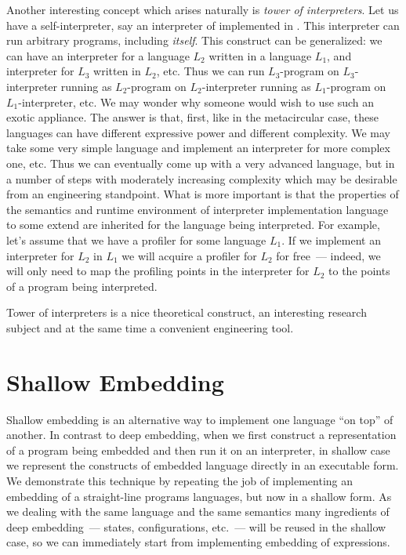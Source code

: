 Another interesting concept which arises naturally is \emph{tower of interpreters}. Let us have a self-interpreter,
say an interpreter of \lama implemented in \lama. This interpreter can run arbitrary \lama programs, including \emph{itself}.
This construct can be generalized: we can have an interpreter for a language $L_2$ written in a language $L_1$, and
interpreter for $L_3$ written in $L_2$, etc. Thus we can run $L_3$-program on $L_3$-interpreter running as $L_2$-program
on $L_2$-interpreter running as $L_1$-program on $L_1$-interpreter, etc. We may wonder why someone would wish to use such an
exotic appliance. The answer is that, first, like in the metacircular case, these languages can have different expressive power
and different complexity. We may take some very simple language and implement an interpreter for more complex one, etc.
Thus we can eventually come up with a very advanced language, but in a number of steps with moderately
increasing complexity which may be desirable from an engineering standpoint. What is more important is that
the properties of the semantics and runtime environment of interpreter implementation language
to some extend are inherited for the language being interpreted. For example, let's assume that we have a profiler for some
language $L_1$. If we implement an interpreter for $L_2$ in $L_1$ we will acquire a profiler for $L_2$ for free~--- indeed,
we will only need to map the profiling points in the interpreter for $L_2$ to the points of a program being interpreted.

Tower of interpreters is a nice theoretical construct, an interesting research subject and at the same time a
convenient engineering tool.


\section{Shallow Embedding}

Shallow embedding is an alternative way to implement one language ``on top'' of another. In contrast to deep embedding, when
we first construct a representation of a program being embedded and then run it on an interpreter, in shallow case we
represent the constructs of embedded language directly in an executable form. We demonstrate this technique by
repeating the job of implementing an embedding of a straight-line programs languages, but now in a shallow form. As
we dealing with the same language and the same semantics many ingredients of deep embedding~--- states, configurations, etc.~---
will be reused in the shallow case, so we can immediately start from implementing embedding of expressions.

